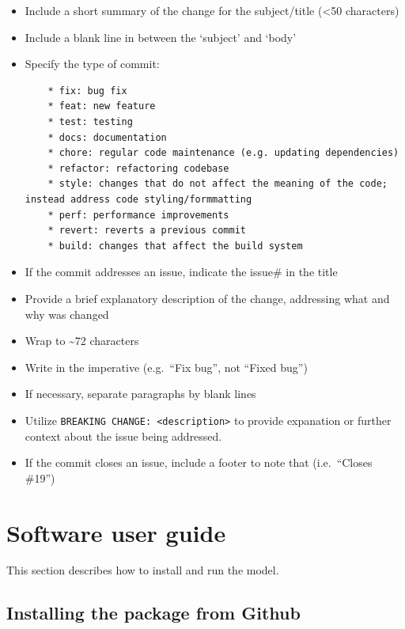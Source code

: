 \documentclass[
]{book}
\begin{document}
\begin{itemize}
\item
  Include a short summary of the change for the subject/title (\textless50 characters)
\item
  Include a blank line in between the `subject' and `body'
\item
  Specify the type of commit:

\begin{verbatim}
    * fix: bug fix
    * feat: new feature
    * test: testing
    * docs: documentation
    * chore: regular code maintenance (e.g. updating dependencies)
    * refactor: refactoring codebase
    * style: changes that do not affect the meaning of the code; instead address code styling/formmatting
    * perf: performance improvements
    * revert: reverts a previous commit
    * build: changes that affect the build system
\end{verbatim}
\item
  If the commit addresses an issue, indicate the issue\# in the title
\item
  Provide a brief explanatory description of the change, addressing what and why was changed
\item
  Wrap to \textasciitilde72 characters
\item
  Write in the imperative (e.g.~``Fix bug'', not ``Fixed bug'')
\item
  If necessary, separate paragraphs by blank lines
\item
  Utilize \texttt{BREAKING\ CHANGE:\ \textless{}description\textgreater{}} to provide expanation or further context about the issue being addressed.
\item
  If the commit closes an issue, include a footer to note that (i.e.~``Closes \#19'')
\end{itemize}

\hypertarget{software-user-guide}{%
\chapter{Software user guide}\label{software-user-guide}}

This section describes how to install and run the model.

\hypertarget{installing-the-package-from-github}{%
\section{Installing the package from Github}\label{installing-the-package-from-github}}
\end{document}
